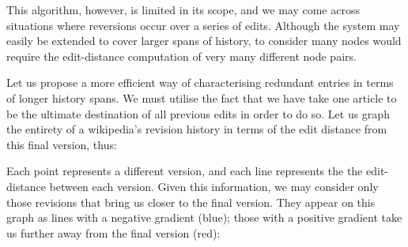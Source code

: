 \documentclass[a4paper,11pt,twoside,notitlepage]{article}
\begin{document}
        This algorithm, however, is limited in its scope, and we may
        come across situations where reversions occur over a series of
        edits. Although the system may easily be extended to cover
        larger spans of history, to consider many nodes would require
        the edit-distance computation of very many different node
        pairs. 

        Let us propose a more efficient way of characterising
        redundant entries in terms of longer history spans. We must
        utilise the fact that we have take one article to be the
        ultimate destination of all previous edits in order to do
        so. Let us graph the entirety of a wikipedia's revision
        history in terms of the edit distance from this final version,
        thus:

        \begin{center}
          \pgfplotsset{width=0.4\textwidth}
          \label{fig:dummy_history}
        \end{center}
        
        Each point represents a different version, and each line
        represents the the edit-distance between each version. Given
        this information, we may consider only those revisions that
        bring us closer to the final version. They appear on this
        graph as lines with a negative gradient (blue); those with a
        positive gradient take us further away from the final version
        (red):

          \begin{center}
          \pgfplotsset{width=0.4\textwidth}
          \end{center}
\end{document}
